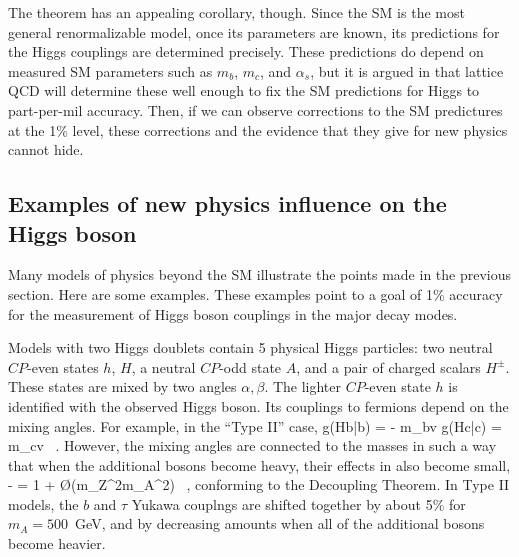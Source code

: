 The theorem has an appealing corollary, though.   Since the SM is the most general renormalizable model, once its parameters are known, its predictions for the Higgs couplings are determined precisely.   These predictions do depend on measured SM parameters such as $m_b$, $m_c$, and $\alpha_s$, but  it is argued in \cite{Lepage:2014fla} that  
lattice QCD will determine these well enough to fix the SM predictions for Higgs to part-per-mil accuracy.   Then, if we can observe corrections to the SM predictures at the 1\% level, these corrections and the evidence that they give for new physics cannot hide.

\subsection{Examples of  new physics influence on the Higgs boson}
\label{subsec:newphysicofH}

Many models of physics beyond the SM illustrate the points made in the previous section. Here are some examples.   These examples point to  a goal of 1\% accuracy
for the measurement of Higgs boson couplings in the major decay modes.

Models with two Higgs doublets contain 5 physical Higgs particles: two  neutral $CP$-even states $h$, $H$,  a neutral $CP$-odd state $A$, and a pair of charged scalars $H^\pm$.  These states are mixed by two angles $\alpha, \beta$. The lighter
$CP$-even state $h$ is identified with the observed Higgs boson.  Its couplings to 
fermions depend on the mixing angles.   For example, in the ``Type II'' case, 
\beq
   g(Hb\bar b) = - {\sin\alpha\over \cos\beta}{m_b\over v}  \quad   g(Hc\bar c) =  {\cos\alpha\over \sin\beta}{m_c\over v}   \ .
However, the mixing angles are connected to the masses in such a way that when the additional bosons become heavy, their effects in  also become small,
\beq
     - {\sin\alpha\over \cos\beta} =  1 + \O({m_Z^2\over m_A^2}) \ ,
\eeqn
conforming to the Decoupling Theorem.   In Type II models, the $b$ and $\tau$ Yukawa couplngs are shifted together by about 5\% for $m_A = 500$~GeV, and by decreasing amounts when all of the additional bosons become heavier.

